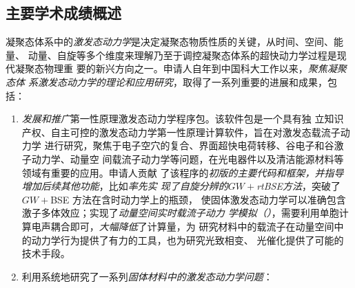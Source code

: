 \vspace{-20pt}

\subsection*{主要学术成绩概述}

凝聚态体系中的\emph{激发态动力学}是决定凝聚态物质性质的关键，从时间、空间、能量、
动量、自旋等多个维度来理解乃至于调控凝聚态体系的超快动力学过程是现代凝聚态物理重
要的新兴方向之一。申请人自年到中国科大工作以来，\emph{聚焦凝聚态体
  系激发态动力学的理论和应用研究}，取得了一系列重要的进展和成果，包括：

\begin{enumerate}
[
  leftmargin=15pt
]
\kaishu{}
  
\item \emph{发展和推广}第一性原理激发态动力学程序包\hnamd{}。该软件包是一个具有独
  立知识产权、自主可控的激发态动力学第一性原理计算软件，旨在对激发态载流子动力学
  进行研究，聚焦于电子空穴的复合、界面超快电荷转移、谷电子和谷激子动力学、动量空
  间载流子动力学等问题，在光电器件以及清洁能源材料等领域有重要的应用。申请人贡献
  了该程序的\emph{初版的主要代码和框架，并指导增加后续其他功能}，比如\emph{率先实
    现了自旋分辨的$GW+{}$rtBSE方法}，突破了$GW+{}$BSE 方法在含时动力学上的瓶颈，
  使固体激发态动力学可以准确包含激子多体效应；实现了\emph{动量空间实时载流子动力
    学模拟（\namdk）}，需要利用单胞计算电声耦合即可，\emph{大幅降低}了计算量，为
  研究材料中的载流子在动量空间中的动力学行为提供了有力的工具，也为研究光致相变、
  光催化提供了可能的技术手段。
  
\item 利用\hnamd{}系统地研究了一系列\emph{固体材料中的激发态动力学问题}：
\end{enumerate}

